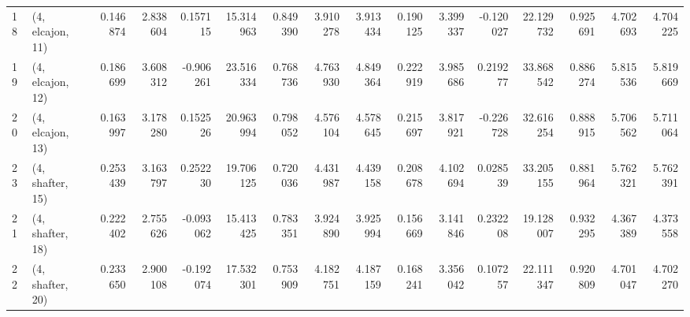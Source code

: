 \begin{tabular}{llrrrrrrrrrrrrrr}
18 &  (4, elcajon, 11) &   0.146874 &  2.838604 &  0.157115 &  15.314963 &  0.849390 &   3.910278 &  3.913434 &  0.190125 &   3.399337 & -0.120027 &   22.129732 &  0.925691 &   4.702693 &   4.704225 \\
19 &  (4, elcajon, 12) &   0.186699 &  3.608312 & -0.906261 &  23.516334 &  0.768736 &   4.763930 &  4.849364 &  0.222919 &   3.985686 &  0.219277 &   33.868542 &  0.886274 &   5.815536 &   5.819669 \\
20 &  (4, elcajon, 13) &   0.163997 &  3.178280 &  0.152526 &  20.963994 &  0.798052 &   4.576104 &  4.578645 &  0.215697 &   3.817921 & -0.226728 &   32.616254 &  0.888915 &   5.706562 &   5.711064 \\
23 &  (4, shafter, 15) &   0.253439 &  3.163797 &  0.252230 &  19.706125 &  0.720036 &   4.431987 &  4.439158 &  0.208678 &   4.102694 &  0.028539 &   33.205155 &  0.881964 &   5.762321 &   5.762391 \\
21 &  (4, shafter, 18) &   0.222402 &  2.755626 & -0.093062 &  15.413425 &  0.783351 &   3.924890 &  3.925994 &  0.156669 &   3.141846 &  0.232208 &   19.128007 &  0.932295 &   4.367389 &   4.373558 \\
22 &  (4, shafter, 20) &   0.233650 &  2.900108 & -0.192074 &  17.532301 &  0.753909 &   4.182751 &  4.187159 &  0.168241 &   3.356042 &  0.107257 &   22.111347 &  0.920809 &   4.701047 &   4.702270 \\
\bottomrule
\end{tabular}
